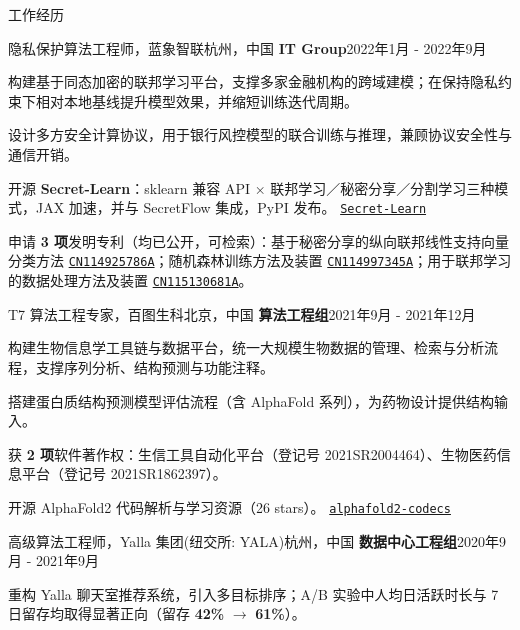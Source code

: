 \documentclass{resume} %
\newcommand{\repo}[2]{\href{#2}{\small\nolinkurl{#1}}}
\begin{document}
\begin{rSection}{工作经历}
\begin{rSubsection}{隐私保护算法工程师，蓝象智联}{杭州，中国}
{\textbf{IT Group}}{2022年1月 - 2022年9月}
\item {构建基于同态加密的联邦学习平台，支撑多家金融机构的跨域建模；在保持隐私约束下相对本地基线提升模型效果，并缩短训练迭代周期。}\\
\item {设计多方安全计算协议，用于银行风控模型的联合训练与推理，兼顾协议安全性与通信开销。}\\
\item {开源 {\textbf{Secret-Learn}}：sklearn 兼容 API × 联邦学习／秘密分享／分割学习三种模式，JAX 加速，并与 SecretFlow 集成，PyPI 发布。 \repo{Secret-Learn}{https://github.com/chenxingqiang/Secret-Learn}}\\
\item {申请 {\textbf{3 项}}发明专利（均已公开，可检索）：基于秘密分享的纵向联邦线性支持向量分类方法 \repo{CN114925786A}{https://patents.google.com/patent/CN114925786A/en}；随机森林训练方法及装置 \repo{CN114997345A}{https://patents.google.com/patent/CN114997345A/en}；用于联邦学习的数据处理方法及装置 \repo{CN115130681A}{https://patents.google.com/patent/CN115130681A/en}。}\\
\end{rSubsection}
\begin{rSubsection}{T7 算法工程专家，百图生科}{北京，中国}
{\textbf{算法工程组}}{2021年9月 - 2021年12月}
\item {构建生物信息学工具链与数据平台，统一大规模生物数据的管理、检索与分析流程，支撑序列分析、结构预测与功能注释。}\\
\item {搭建蛋白质结构预测模型评估流程（含 AlphaFold 系列），为药物设计提供结构输入。}\\
\item {获 {\textbf{2 项}}软件著作权：生信工具自动化平台（登记号 2021SR2004464）、生物医药信息平台（登记号 2021SR1862397）。}\\
\item {开源 AlphaFold2 代码解析与学习资源（26 stars）。 \repo{alphafold2-codecs}{https://github.com/chenxingqiang/alphafold2-codecs}}\\
\end{rSubsection}
\begin{rSubsection}{高级算法工程师，Yalla 集团(纽交所: YALA)}{杭州，中国}
{\textbf{数据中心工程组}}{2020年9月 - 2021年9月}
\item {重构 Yalla 聊天室推荐系统，引入多目标排序；A/B 实验中人均日活跃时长与 7 日留存均取得显著正向（留存 {\textbf{42\%}} $\rightarrow$ {\textbf{61\%}}）。}\\

\end{rSubsection}
\end{rSection}
\end{document}
